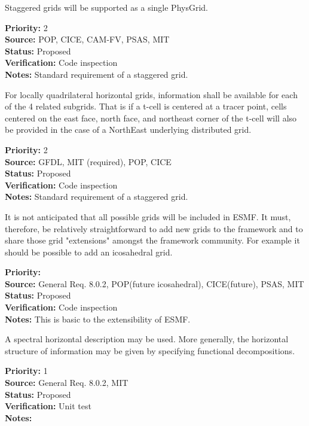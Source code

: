 Staggered grids will be supported as a single PhysGrid.
\begin{reqlist}
{\bf Priority:} 2 \\
{\bf Source:} POP, CICE, 
CAM-FV, PSAS, MIT  \\
{\bf Status:} Proposed \\
{\bf Verification:} Code inspection\\
{\bf Notes:} Standard requirement of a staggered grid.
\end{reqlist}

For locally quadrilateral horizontal grids, information shall be available for
each of the 4 related subgrids.  That is if a t-cell is centered at a tracer
point,  cells centered on the east face, north face, and northeast corner of
the t-cell will also be provided in the case of a NorthEast underlying
distributed grid.
\begin{reqlist}
{\bf Priority:} 2 \\
{\bf Source:} GFDL, MIT (required), POP, CICE \\
{\bf Status:} Proposed \\
{\bf Verification:} Code inspection\\
{\bf Notes:} Standard requirement of a staggered grid.
\end{reqlist}

It is not anticipated that all possible grids will be included in
ESMF. It must, therefore, be relatively straightforward to add
new grids to the framework and to share those grid "extensions"
amongst the framework community. For example it should be possible
to add an icosahedral grid.
\begin{reqlist}
{\bf Priority:} \\
{\bf Source:} General Req. 8.0.2, POP(future icosahedral), CICE(future), 
PSAS, MIT  \\
{\bf Status:} Proposed \\
{\bf Verification:} Code inspection \\
{\bf Notes:} This is basic to the extensibility of ESMF.
\end{reqlist}


A spectral horizontal description may be used.  More generally, the horizontal
structure of information may be given by specifying functional decompositions.
\begin{reqlist}
{\bf Priority:} 1 \\
{\bf Source:} General Req. 8.0.2, MIT  \\
{\bf Status:} Proposed \\
{\bf Verification:} Unit test\\
{\bf Notes:}
\end{reqlist}

